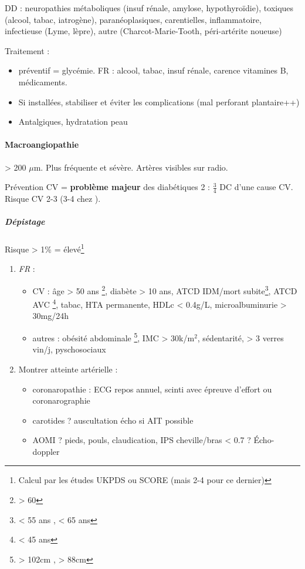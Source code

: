 \documentclass[11pt]{article}
\begin{document}
DD : neuropathies métaboliques (insuf rénale, amylose, hypothyroïdie), toxiques
(alcool, tabac, iatrogène), paranéoplasiques, carentielles, inflammatoire,
infectieuse (Lyme, lèpre), autre (Charcot-Marie-Tooth, péri-artérite noueuse)

Traitement : 
\begin{itemize}
\item préventif = glycémie. FR : alcool, tabac, insuf rénale, carence vitamines B, médicaments.
\item Si installées, stabiliser et éviter les complications (mal perforant plantaire++)
\item Antalgiques, hydratation peau
\end{itemize}

\paragraph{Macroangiopathie}
\label{sec:org2aba84e}
\diameter > 200 \(\mu\)m. Plus fréquente et sévère. Artères visibles sur radio.

Prévention CV = \textbf{problème majeur} des diabétiques 2 : \(\frac{3}{4}\) DC d'une cause
CV. Risque CV \texttimes{}2-3 (\texttimes{}3-4 chez \female). 

\subparagraph{Dépistage}
\label{sec:org34b5b6f}
Risque > 1\% = élevé\footnote{Calcul par les études UKPDS ou SCORE (mais \texttimes{}2-4 pour ce dernier)}

\begin{enumerate}
\item \emph{FR} :
\begin{itemize}
\item CV : âge > 50 ans \male \footnote{> 60 \female}, diabète > 10 ans, ATCD IDM/mort
subite\footnote{< 55 ans \male, < 65 ans \female}, ATCD AVC \footnote{< 45 ans},  tabac, HTA permanente, HDLc < 0.4g/L, microalbuminurie > 30mg/24h
\item autres : obésité abdominale \footnote{> 102cm \male, > 88cm \female}, IMC > 30k/m\(^{\text{2}}\), sédentarité, > 3 verres vin/j, pyschosociaux
\end{itemize}

\item Montrer atteinte artérielle : 
\begin{itemize}
\item coronaropathie : ECG repos annuel, scinti avec épreuve d'effort ou coronarographie
\item carotides ? auscultation \thus écho si AIT possible
\item AOMI ? pieds, pouls, claudication, IPS cheville/bras < 0.7 ? Écho-doppler
\end{itemize}
\end{enumerate}
\end{document}
